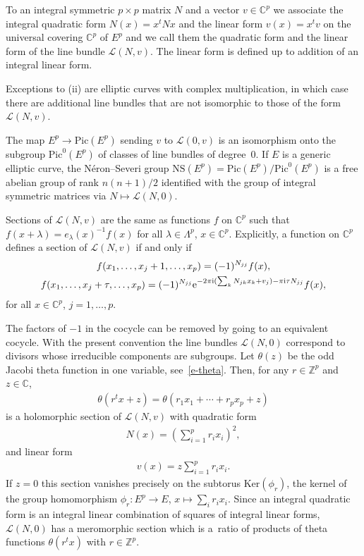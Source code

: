 \documentclass[10pt,a4paper]{amsart}
\numberwithin{equation}{section}
\begin{document}
To an integral symmetric $p\times p$ matrix $N$ and a vector $v\in \mathbb C^p$ we associate the integral quadratic form $N(x)=x^tNx$ and the linear form $v(x)=x^tv$ on the universal covering $\mathbb C^p$ of $E^p$ and we call them the quadratic form and the linear form of the line bundle $\mathcal L(N,v)$. The linear form is defined up to addition of an integral linear form.

\begin{Remark} Exceptions to (ii) are elliptic curves with complex multiplication, in which case there are additional line bundles that are not isomorphic to those of the form $\mathcal L(N,v)$.
\end{Remark}
\begin{Remark} The map $E^p\to \mathrm{Pic}(E^p)$ sending $v$ to $\mathcal L(0,v)$ is an isomorphism onto the subgroup $\mathrm{Pic}^0(E^p)$ of classes of line bundles of degree~0. If $E$ is a generic elliptic curve, the N\'eron--Severi group $\mathrm{NS}(E^p)=\mathrm{Pic}(E^p)/\mathrm{Pic}^0(E^p)$ is a free abelian group of rank $n(n+1)/2$ identified with the group of integral symmetric matrices via $N\mapsto \mathcal L(N,0)$.
\end{Remark}
\begin{Remark} \label{rem5.4} Sections of $\mathcal L(N,v)$ are the same as functions $f$ on $\mathbb C^p$ such that $f(x+\lambda)=e_\lambda(x)^{-1}f(x)$ for all $\lambda\in\Lambda^p$, $x\in\mathbb C^p$. Explicitly, a function on $\mathbb C^p$ defines a section of $\mathcal L(N,v)$ if and only if
 \begin{gather*} f(x_1,\dots,x_j+1,\dots,x_p) = (-1)^{N_{jj}}f(x), \\
 f(x_1,\dots,x_j+\tau,\dots,x_p) = (-1)^{N_{jj}}{\rm e}^{-2\pi{\rm i}(\sum_k N_{jk}x_k+v_j)-\pi {\rm i} \tau N_{jj}} f(x),
 \end{gather*} for all $x\in\mathbb C^p$, $j=1,\dots,p$.
\end{Remark}
\begin{Remark} The factors of $-1$ in the cocycle can be removed by going to an equivalent cocycle. With the present convention the line bundles $\mathcal L(N,0)$ correspond to divisors whose irreducible components are subgroups. Let $\theta(z)$ be the odd Jacobi theta function in one variable, see~\eqref{e-theta}. Then, for any $r\in\mathbb Z^p$ and $z\in\mathbb C$,
 \begin{gather*}
 \theta(r^tx+z)=\theta(r_1x_1+\cdots+r_px_p+z)
 \end{gather*}
 is a holomorphic section of $\mathcal L(N,v)$ with quadratic form
 \begin{gather*}
 N(x)=\left(\sum_{i=1}^pr_ix_i\right)^2,
 \end{gather*}
 and linear form
 \begin{gather*}
 v(x)=z\sum_{i=1}^p r_ix_i.
 \end{gather*}
If $z=0$ this section vanishes precisely on the subtorus $\mathrm{Ker}(\phi_r)$, the kernel of the group homomorphism $\phi_r\colon E^p\to E$, $x\mapsto \sum_ir_ix_i$. Since an integral quadratic form is an integral linear combination of squares of integral linear forms, $\mathcal L(N,0)$ has a meromorphic section which is a~ratio of products of theta functions $\theta(r^tx)$ with $r\in\mathbb Z^p$.
\end{Remark}
\end{document}
